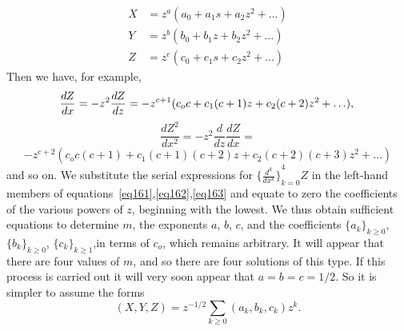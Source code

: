 \[
\begin{aligned}
X&=z^a\left(a_0+a_1 s+a_2 z^2+\ldots\right)\\
Y&=z^b\left(b_0+b_1 z+b_2 z^2+\ldots\right)\\
Z&=z^e\left(c_0+c_1 s+c_2 z^2+\ldots\right)
\end{aligned}
\]
Then we have, for example,
\[
\frac{dZ}{dx} = -z^2 \frac{dZ}{dz}=-z^{c+1}
(c_o c + c_1(c+1)z + c_2(c+2)z^2 +\ldots),\nonumber \\
\]
\[
\frac{dZ^2}{dx^2} = -z^2 \frac{d}{dz}\frac{dZ}{dx}=
\]
\begin{equation}\label{eq164}
-z^{c+2}
(c_o c (c+1)+ c_1(c+1)(c+2)z + c_2(c+2)(c+3)z^2 + \ldots)
\end{equation}
and so on. We substitute the serial expressions for
\({\{\frac{d^k}{dx^k}\}}_{k=0}^4 Z\) in the left-hand
members of equations~\ref{eq161},\ref{eq162},\ref{eq163} and equate to
zero the coefficients of the various powers of \(z\),
beginning with the lowest.
We thus obtain sufficient equations to determine
\(m\), the exponents \(a\), \(b\), \(c\),
and the coefficients \({\{a_k\}}_{k\geq 0}\),
\({\{b_k\}}_{k\geq 0}\), \({\{c_k\}}_{k\geq 1}\),in terms of
\(c_o\), which remains arbitrary.
It will appear that there are four values of \(m\),
and so there are four solutions of this type.
If this process is carried out it will very
soon appear that
\(a=b=c=1/2\).  So it is simpler to assume the forms
\begin{equation}\label{eq165}
    (X,Y,Z)= z^{-1/2} \sum_{k \geq 0} (a_k, b_k, c_k ) z^k.
\end{equation}

